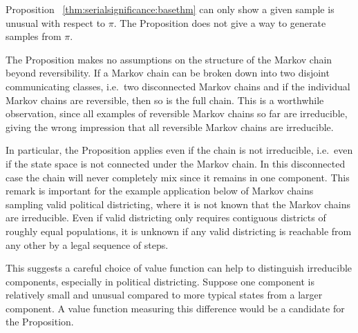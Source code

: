 \documentclass[12pt]{article}
\begin{document}
\begin{example}
\begin{remark}
\end{remark}

\begin{remark}
    Proposition~%
    \ref{thm:serialsignificance:basethm} can only show a given sample is
    unusual with respect to \( \pi \).  The Proposition does not give a
    way to generate samples from \( \pi \).
\end{remark}

\begin{remark}
    The Proposition makes no assumptions on the structure of the Markov
    chain beyond reversibility.  If a Markov chain can be broken down
    into two disjoint communicating classes, i.e.\ two disconnected
    Markov chains and if the individual Markov chains are reversible,
    then so is the full chain.  This is a worthwhile observation, since
    all examples of reversible Markov chains so far are irreducible,
    giving the wrong impression that all reversible Markov chains are
    irreducible.

    In particular, the Proposition applies even if the chain is not
    irreducible, i.e.\ even if the state space is not connected under
    the Markov chain.  In this disconnected case the chain will never
    completely mix since it remains in one component.  This remark is
    important for the example application below of Markov chains
    sampling valid political districting, where it is not known that the
    Markov chains are irreducible.  Even if valid districting only
    requires contiguous districts of roughly equal populations, it is
    unknown if any valid districting is reachable from any other by a
    legal sequence of steps.

    This suggests a careful choice of value function can help to
    distinguish irreducible components, especially in political
    districting.  Suppose one component is relatively small and unusual
    compared to more typical states from a larger component. A value
    function measuring this difference would be a candidate for the
    Proposition.
\end{remark}


\end{example}
\end{document}
